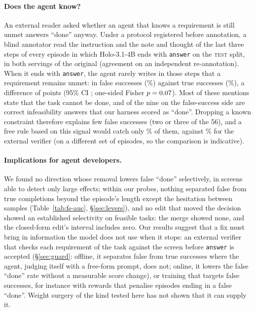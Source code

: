 \paragraph{Does the agent know?} An external reader asked whether an agent that knows a requirement is still unmet answers ``done'' anyway. Under a protocol registered before annotation, a blind annotator read the instruction and the note and thought of the last three steps of every episode in which Holo-3.1-4B ends with \texttt{answer} on the \textsc{test} split, in both servings of the original (agreement \cdAudit{} on an independent re-annotation). When it ends with \texttt{answer}, the agent rarely writes in those steps that a requirement remains unmet: in \cdFs{} false successes (\cdFsPct\%) against \cdTs{} true successes (\cdTsPct\%), a difference of \cdDiff{} points (95\% CI \cdDiffCi; one-sided Fisher $p=0.07$). Most of these mentions state that the task cannot be done, and \cdRegex{} of the nine on the false-success side are correct infeasibility answers that our harness scored as ``done''. Dropping a known constraint therefore explains few false successes (two or three of the 56), and a free rule based on this signal would catch only \cdFsPct\% of them, against \gbClaudeDet\% for the external verifier (on a different set of episodes, so the comparison is indicative). %

\paragraph{Implications for agent developers.} We found no direction whose removal lowers false ``done'' selectively, in screens able to detect only large effects; within our probes, nothing separated false from true completions beyond the episode's length except the hesitation between samples (Table~\ref{tab:fs-auc}, \S\ref{sec:levers}), and no edit that moved the decision showed an established selectivity on feasible tasks: the merge showed none, and the closed-form edit's interval includes zero. Our results suggest that a fix must bring in information the model does not use when it stops: an external verifier that checks each requirement of the task against the screen before \texttt{answer} is accepted (\S\ref{sec:guard}: offline, it separates false from true successes where the agent, judging itself with a free-form prompt, does not; online, it lowers the false ``done'' rate without a measurable score change), or training that targets false successes, for instance with rewards that penalise episodes ending in a false ``done''. Weight surgery of the kind tested here has not shown that it can supply it.

